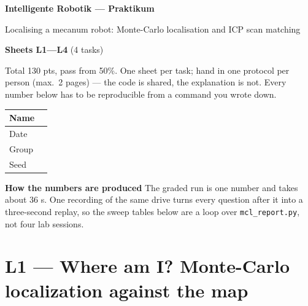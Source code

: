 \documentclass[a4paper,10pt]{article}
\begin{document}
\begin{center}\large\bfseries Intelligente Robotik --- Praktikum\end{center}
\vspace{-6pt}\begin{center}Localising a mecanum robot: Monte-Carlo localisation and ICP scan matching\end{center}
\vspace{2pt}
\noindent\begin{minipage}[t]{0.60\textwidth}\raggedright
\textbf{Sheets L1---L4}          (4 tasks)

Total 130 pts, pass from 50\%. One sheet per task; hand in one protocol per person (max.\ 2 pages) --- the code is shared, the explanation is not. Every number below has to be reproducible from a command you wrote down.
\end{minipage}\hfill\begin{minipage}[t]{0.38\textwidth}
\begin{tabular}{|l|p{3.6cm}|}
\hline
Name & \rule{0pt}{1.4em} \\
\hline
Date & \rule{0pt}{1.4em} \\
\hline
Group & \rule{0pt}{1.4em} \\
\hline
Seed & \rule{0pt}{1.4em} \\
\hline
\end{tabular}
\end{minipage}
\vspace{4pt}

\vspace{2pt}\noindent\textbf{How the numbers are produced}
The graded run is one number and takes about 36 s. One recording of the same drive turns every question after it into a three-second replay, so the sweep tables below are a loop over \texttt{mcl\_report.py}, not four lab sessions.
\vspace{2pt}{\small
\begin{verbatim}
./tools/run_lab.sh grade --task mcl_production --controller student/mcl_template.py --headless
OHM_RECORD=/tmp/l1.jsonl ./tools/run_lab.sh grade --task mcl_production \
        --controller tools/record_scans.py --headless            # one drive, everything it saw
./tools/mcl_report.py /tmp/l1.jsonl --particles 250 --stride 1 --sigma-z 0.5 --timing
\end{verbatim}
}
\vspace{6pt}

\section{L1 --- Where am I? Monte-Carlo localization against the map}
\end{document}
